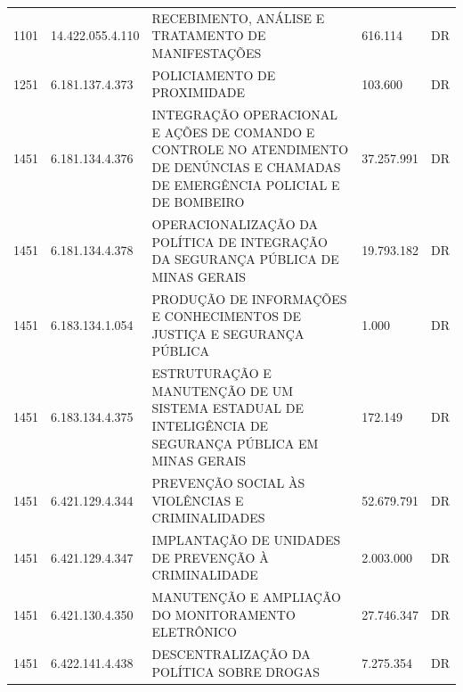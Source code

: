 \documentclass{article}
\begin{document}
\begin{longtable}[c]{m{1cm}|m{2cm}|m{10cm}|m{2cm}|m{1cm}}
\multicolumn{1}{C{1cm}|}{1101} & \multicolumn{1}{C{2cm}|}{14.422.055.4.110} & \multicolumn{1}{L{10cm}|}{RECEBIMENTO, ANÁLISE E TRATAMENTO DE MANIFESTAÇÕES} & \multicolumn{1}{R{2cm}|}{616.114} & \multicolumn{1}{C{1cm}}{DR} \\
\multicolumn{1}{C{1cm}|}{1251} & \multicolumn{1}{C{2cm}|}{6.181.137.4.373} & \multicolumn{1}{L{10cm}|}{POLICIAMENTO DE PROXIMIDADE} & \multicolumn{1}{R{2cm}|}{103.600} & \multicolumn{1}{C{1cm}}{DR} \\
\multicolumn{1}{C{1cm}|}{1451} & \multicolumn{1}{C{2cm}|}{6.181.134.4.376} & \multicolumn{1}{L{10cm}|}{INTEGRAÇÃO OPERACIONAL E AÇÕES DE COMANDO E CONTROLE NO ATENDIMENTO DE DENÚNCIAS E CHAMADAS DE EMERGÊNCIA POLICIAL E DE BOMBEIRO} & \multicolumn{1}{R{2cm}|}{37.257.991} & \multicolumn{1}{C{1cm}}{DR} \\
\multicolumn{1}{C{1cm}|}{1451} & \multicolumn{1}{C{2cm}|}{6.181.134.4.378} & \multicolumn{1}{L{10cm}|}{OPERACIONALIZAÇÃO DA POLÍTICA DE INTEGRAÇÃO DA SEGURANÇA PÚBLICA DE MINAS GERAIS} & \multicolumn{1}{R{2cm}|}{19.793.182} & \multicolumn{1}{C{1cm}}{DR} \\
\multicolumn{1}{C{1cm}|}{1451} & \multicolumn{1}{C{2cm}|}{6.183.134.1.054} & \multicolumn{1}{L{10cm}|}{PRODUÇÃO DE INFORMAÇÕES E CONHECIMENTOS DE JUSTIÇA E SEGURANÇA PÚBLICA} & \multicolumn{1}{R{2cm}|}{1.000} & \multicolumn{1}{C{1cm}}{DR} \\
\multicolumn{1}{C{1cm}|}{1451} & \multicolumn{1}{C{2cm}|}{6.183.134.4.375} & \multicolumn{1}{L{10cm}|}{ESTRUTURAÇÃO E MANUTENÇÃO DE UM SISTEMA ESTADUAL DE INTELIGÊNCIA DE SEGURANÇA PÚBLICA EM MINAS GERAIS} & \multicolumn{1}{R{2cm}|}{172.149} & \multicolumn{1}{C{1cm}}{DR} \\
\multicolumn{1}{C{1cm}|}{1451} & \multicolumn{1}{C{2cm}|}{6.421.129.4.344} & \multicolumn{1}{L{10cm}|}{PREVENÇÃO SOCIAL ÀS VIOLÊNCIAS E CRIMINALIDADES} & \multicolumn{1}{R{2cm}|}{52.679.791} & \multicolumn{1}{C{1cm}}{DR} \\
\multicolumn{1}{C{1cm}|}{1451} & \multicolumn{1}{C{2cm}|}{6.421.129.4.347} & \multicolumn{1}{L{10cm}|}{IMPLANTAÇÃO DE UNIDADES DE PREVENÇÃO À CRIMINALIDADE} & \multicolumn{1}{R{2cm}|}{2.003.000} & \multicolumn{1}{C{1cm}}{DR} \\
\multicolumn{1}{C{1cm}|}{1451} & \multicolumn{1}{C{2cm}|}{6.421.130.4.350} & \multicolumn{1}{L{10cm}|}{MANUTENÇÃO E AMPLIAÇÃO DO MONITORAMENTO ELETRÔNICO} & \multicolumn{1}{R{2cm}|}{27.746.347} & \multicolumn{1}{C{1cm}}{DR} \\
\multicolumn{1}{C{1cm}|}{1451} & \multicolumn{1}{C{2cm}|}{6.422.141.4.438} & \multicolumn{1}{L{10cm}|}{DESCENTRALIZAÇÃO DA POLÍTICA SOBRE DROGAS} & \multicolumn{1}{R{2cm}|}{7.275.354} & \multicolumn{1}{C{1cm}}{DR} \\

\end{longtable}
\end{document}
